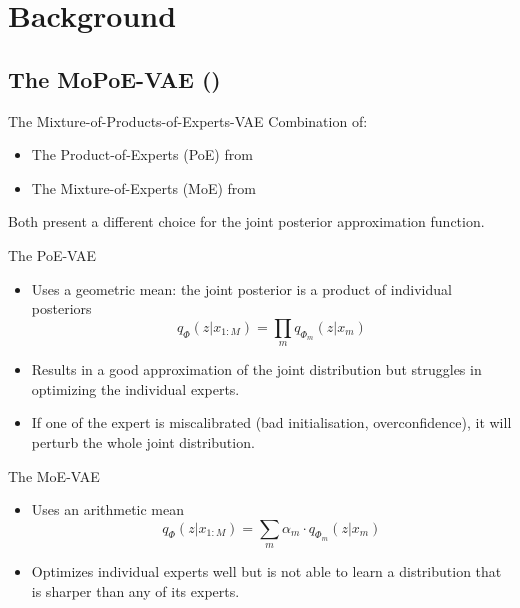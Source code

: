     \section{Background}

    \subsection{The MoPoE-VAE (\cite{thomas_gener-ELBO})}
    \begin{frame}{The Mixture-of-Products-of-Experts-VAE}
    \pause
        Combination of:
        \begin{itemize}
            \item The Product-of-Experts (PoE) from \cite{wu2018multimodal}
            \item The Mixture-of-Experts (MoE) from \cite{shi2019variational}
        \end{itemize}
        \vspace{\baselineskip}
        Both present a different choice for the joint posterior approximation function.
    \end{frame}
    
    \begin{frame}{The PoE-VAE}

        \begin{itemize}
            \item Uses a geometric mean: the joint posterior is a product of individual posteriors
            \begin{equation}
                q_{\Phi}(z|x_{1:M})=\prod _m q_{\Phi_m}(z|x_m)
            \end{equation}
            \item Results in a good approximation of the joint distribution but struggles in optimizing the individual experts.
            \item If one of the expert is miscalibrated (bad initialisation, overconfidence), it will perturb the whole joint distribution. 
        \end{itemize}
    \end{frame}

    \begin{frame}{The MoE-VAE}
        \begin{itemize}
            \item Uses an arithmetic mean
            \begin{equation}
                q_{\Phi}(z|x_{1:M})=\sum _m \alpha_m\cdot q_{\Phi_m}(z|x_m)
            \end{equation}
            \item Optimizes individual experts well but is not able to learn a distribution that is sharper than any of its experts.
        \end{itemize}

    \end{frame}

